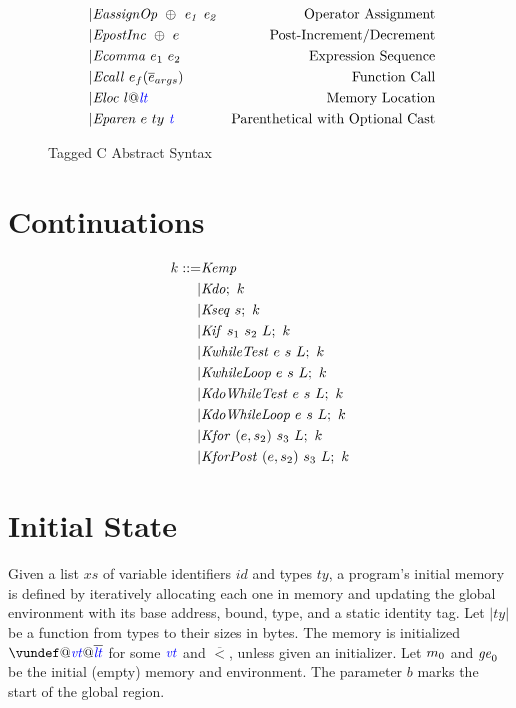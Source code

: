 \documentclass{llncs}
\begin{document}
\begin{figure}
\begin{subfigure}[t]{0.69\textwidth}
\[\begin{aligned}
    | & \mathit{EassignOp ~ \oplus ~ e_1 ~ e_2} & \textnormal{Operator Assignment} \\
    | & \mathit{EpostInc} ~ \oplus ~ e & \textnormal{Post-Increment/Decrement} \\
    | & \mathit{Ecomma} ~ e_1 ~ e_2 & \textnormal{Expression Sequence} \\
    | & \mathit{Ecall} ~ e_f(\overline{e}_{args}) & \textnormal{Function Call} \\
    | & \mathit{Eloc} ~ l@\mathit{\color{blue} lt} & \textnormal{Memory Location} \\
    | & \mathit{Eparen} ~ e ~ ty ~ \mathit{\color{blue} t} & \textnormal{Parenthetical with Optional Cast} \\
    \end{aligned}\]
  \end{subfigure}
  \caption{Tagged C Abstract Syntax}
  \label{fig:syntax}
\end{figure}

\section{Continuations}
\label{app:continuations}

\[\begin{split}
k ::= & \mathit{Kemp} \\
| & \mathit{Kdo};~ k \\
| & \mathit{Kseq} ~ s; ~ k \\
| & \mathit{Kif} ~ s_1 ~ s_2 ~ L; ~ k \\
| & \mathit{KwhileTest} ~ e ~ s ~ L; ~ k \\
| & \mathit{KwhileLoop} ~ e ~ s ~ L; ~ k \\
| & \mathit{KdoWhileTest} ~ e ~ s ~ L; ~ k \\
| & \mathit{KdoWhileLoop} ~ e ~ s ~ L; ~ k \\
| & \mathit{Kfor} ~ (e,s_2) ~ s_3 ~ L ; ~ k \\
| & \mathit{KforPost} ~ (e,s_2) ~ s_3 ~ L ; ~ k \\
\end{split}\]

\section{Initial State}

Given a list \(xs\) of variable identifiers \(id\) and types
\(ty\), a program's initial memory is defined by iteratively allocating each one
in memory and updating the global environment with its base address, bound, type,
and a static identity tag. Let \(|ty|\) be a function from types to their sizes
in bytes. The memory is initialized \(\vundef@\vt@\overline{\lt}\)
for some \(\mathit{\color{blue} vt}\) and \(\overline{\lt}\), unless given an initializer.
Let \(m_0\) and \(\mathit{ge}_0\) be the initial (empty) memory and environment.
The parameter \(b\) marks the start of the global region.
\end{document}
